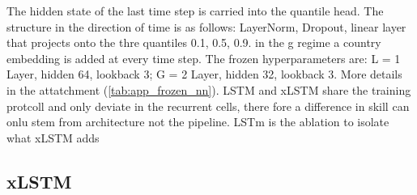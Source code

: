 
The hidden state of the last time step is carried into the quantile head. The structure in the direction of time is as follows: LayerNorm, Dropout, linear layer that projects onto the thre quantiles {0.1, 0.5, 0.9}. in the g regime a country embedding is added at every time step. The frozen hyperparameters are: L = 1 Layer, hidden 64, lookback 3; G = 2 Layer, hidden 32, lookback 3. More details in the attatchment (\cref{tab:app_frozen_nn}). LSTM and xLSTM share the training protcoll and only deviate in the recurrent cells, there fore a difference in skill can onlu stem from architecture not the pipeline. LSTm is the ablation to isolate what xLSTM adds 


\subsection{xLSTM}
\label{sec:models:xlstm}

